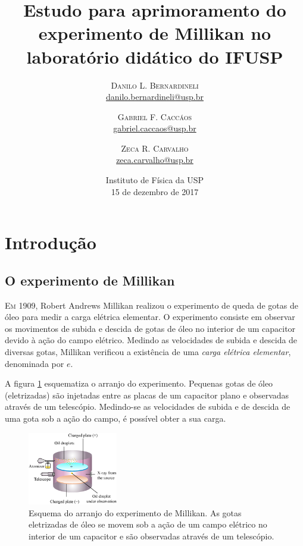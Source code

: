 \documentclass[twoside, twocolumn]{article}
\title{Estudo para aprimoramento do experimento de Millikan no laboratório didático do IFUSP} %
\author{%
\textsc{Danilo L. Bernardineli} \\[1ex] %
\normalsize \href{mailto:danilo.bernardineli@usp.br}{danilo.bernardineli@usp.br} %
\and %
\textsc{Gabriel F. Caccáos} \\[1ex] %
\normalsize \href{mailto:gabriel.caccaos@usp.br}{gabriel.caccaos@usp.br} %
\and %
\textsc{Zeca R. Carvalho} \\[1ex] %
\normalsize \href{mailto:zeca.carvalho@usp.br}{zeca.carvalho@usp.br} %
}
\date{Instituto de Física da USP \\[2 ex]15 de dezembro de 2017} %
\begin{document}
\maketitle
  
\section{Introdução}
\subsection{O experimento de Millikan}


\lettrine[nindent=0em,lines=3]{E}m 1909, Robert Andrews Millikan realizou o experimento de queda de gotas de óleo para medir a carga elétrica elementar. O experimento consiste em observar os movimentos de subida e descida de gotas de óleo no interior de um capacitor devido à ação do campo elétrico. Medindo as velocidades de subida e descida de diversas gotas, Millikan verificou a existência de uma \emph{carga elétrica elementar}, denominada por $e$.

A figura \ref{fig:esquema} esquematiza o arranjo do experimento. Pequenas gotas de óleo (eletrizadas) são injetadas entre as placas de um capacitor plano e observadas através de um telescópio. Medindo-se as velocidades de subida e de descida de uma gota sob a ação do campo, é possível obter a sua carga. \cite{millikan}

\begin{figure}[h]
	\centering
	\includegraphics[width = 0.35\textwidth]{1.png}
    \caption{Esquema do arranjo do experimento de Millikan. As gotas eletrizadas de óleo se movem sob a ação de um campo elétrico no interior de um capacitor e são observadas através de um telescópio.}
    \label{fig:esquema}
\end{figure}
\end{document}
